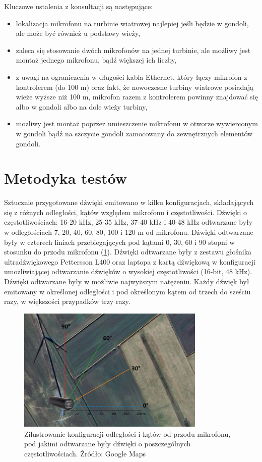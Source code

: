 \documentclass{sprz}
\begin{document}
Kluczowe ustalenia z konsultacji są następujące:
\begin{itemize}
  \item{lokalizacja mikrofonu na turbinie wiatrowej najlepiej jeśli będzie w gondoli, ale może być również u podstawy wieży,}
  \item{zaleca się stosowanie dwóch mikrofonów na jednej turbinie, ale możliwy jest montaż jednego mikrofonu, bądź większej ich liczby,}
  \item{z uwagi na ograniczenia w długości kabla Ethernet, który łączy mikrofon z kontrolerem (do 100 m) oraz fakt, że nowoczesne turbiny wiatrowe posiadają wieże wyższe niż 100 m, mikrofon razem z kontrolerem powinny znajdować się albo w gondoli albo na dole wieży turbiny,}
  \item{możliwy jest montaż poprzez umieszczenie mikrofonu w otworze wywierconym w gondoli bądź na szczycie gondoli zamocowany do zewnętrznych elementów gondoli.}
\end{itemize}

\section{Metodyka testów}
Sztucznie przygotowane dźwięki emitowano w kilku konfiguracjach, składających się z różnych odległości, kątów względem mikrofonu i częstotliwości. Dźwięki o częstotliwościach: 16-20 kHz, 25-35 kHz, 37-40 kHz i 40-48 kHz odtwarzane były w odległościach 7, 20, 40, 60, 80, 100 i 120 m od mikrofonu. Dźwięki odtwarzane były w czterech liniach przebiegających pod kątami 0, 30, 60 i 90 stopni w stosunku do przodu mikrofonu (\ref{img:angles}). Dźwięki odtwarzane były z zestawu głośnika ultradźwiękowego Pettersson L400 oraz laptopa z kartą dźwiękową w konfiguracji umożliwiającej odtwarzanie dźwięków o wysokiej częstotliwości (16-bit, 48 kHz). Dźwięki odtwarzane były w możliwie najwyższym natężeniu. Każdy dźwięk był emitowany w określonej odległości i pod określonym kątem od trzech do sześciu razy, w większości przypadków trzy razy.

\begin{figure}[h]
  \centering
  \includegraphics[width=0.8\textwidth]{sprz/angles.png}
  \caption{Zilustrowanie konfiguracji odległości i kątów od przodu mikrofonu, pod jakimi odtwarzane były dźwięki o poszczególnych częstotliwościach. Źródło: Google Maps}
  \label{img:angles}
\end{figure} 
\end{document}
